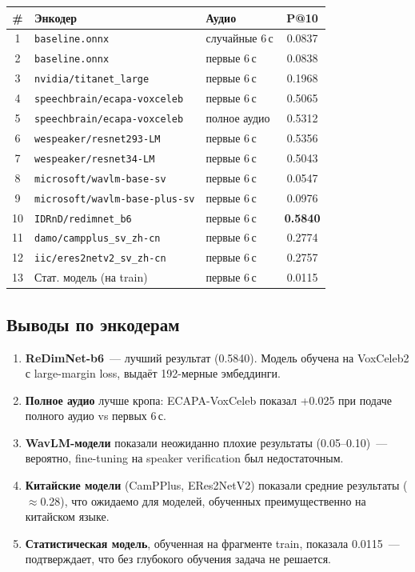 \documentclass[12pt,a4paper]{article}
\begin{document}
\begin{tabular}{c l l c}
\hline
\# & Энкодер & Аудио & P@10 \\
\hline
1 & \texttt{baseline.onnx} & случайные 6\,с & 0.0837 \\
2 & \texttt{baseline.onnx} & первые 6\,с & 0.0838 \\
3 & \texttt{nvidia/titanet\_large} & первые 6\,с & 0.1968 \\
4 & \texttt{speechbrain/ecapa-voxceleb} & первые 6\,с & 0.5065 \\
5 & \texttt{speechbrain/ecapa-voxceleb} & полное аудио & 0.5312 \\
6 & \texttt{wespeaker/resnet293-LM} & первые 6\,с & 0.5356 \\
7 & \texttt{wespeaker/resnet34-LM} & первые 6\,с & 0.5043 \\
8 & \texttt{microsoft/wavlm-base-sv} & первые 6\,с & 0.0547 \\
9 & \texttt{microsoft/wavlm-base-plus-sv} & первые 6\,с & 0.0976 \\
10 & \texttt{IDRnD/redimnet\_b6} & первые 6\,с & \textbf{0.5840} \\
11 & \texttt{damo/campplus\_sv\_zh-cn} & первые 6\,с & 0.2774 \\
12 & \texttt{iic/eres2netv2\_sv\_zh-cn} & первые 6\,с & 0.2757 \\
13 & Стат. модель (на train) & первые 6\,с & 0.0115 \\
\hline
\end{tabular}

\subsection{Выводы по энкодерам}

\begin{enumerate}
  \item \textbf{ReDimNet-b6}~--- лучший результат (0.5840). Модель обучена на VoxCeleb2 с large-margin loss, выдаёт 192-мерные эмбеддинги.
  \item \textbf{Полное аудио} лучше кропа: ECAPA-VoxCeleb показал +0.025 при подаче полного аудио vs первых 6\,с.
  \item \textbf{WavLM-модели} показали неожиданно плохие результаты (0.05--0.10)~--- вероятно, fine-tuning на speaker verification был недостаточным.
  \item \textbf{Китайские модели} (CamPPlus, ERes2NetV2) показали средние результаты ($\approx$0.28), что ожидаемо для моделей, обученных преимущественно на китайском языке.
  \item \textbf{Статистическая модель}, обученная на фрагменте train, показала 0.0115~--- подтверждает, что без глубокого обучения задача не решается.
\end{enumerate}
\end{document}
